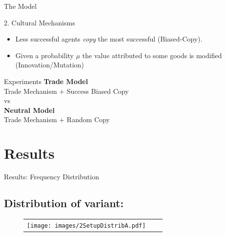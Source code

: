 \documentclass[12pt, notes=show]{beamer}
\begin{document}
	\begin{frame}{The Model}
		\begin{block}{2. Cultural Mechanisms}
			\begin{itemize}
					\vfill
				\item Less successful agents \emph{copy} the most successful (Biased-Copy).
					\vfill
				\item Given a probability $\mu$ the value attributed to some goods is modified (Innovation/Mutation)
			\end{itemize}
		\end{block}
	\end{frame}
\begin{frame}{Experiments}
	\centering
	\textbf{Trade Model} \\Trade Mechanism + Success Biased Copy\\
	\vfill
	vs\\
	\vfill
	\textbf{Neutral Model}\\ Trade Mechanism + Random Copy\\
	 

\end{frame}


\section{Results}

\begin{frame}{Results: Frequency Distribution}
    \subsection*{Distribution of variant:}
    \begin{figure}[!h]
	\begin{center}
	    \begin{tabular}{ccc}
		\texttt{[image: images/2SetupDistribA.pdf]}\\
	    \end{tabular}

	\end{center}
    \end{figure}
\end{frame}
\end{document}
